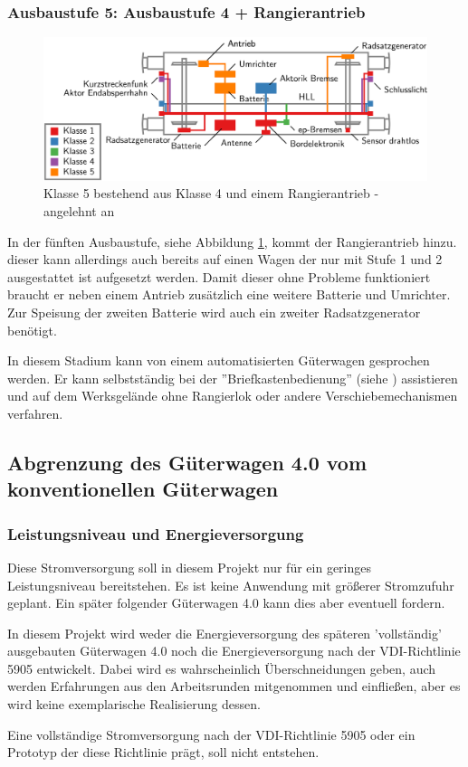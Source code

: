 \subsubsection{Ausbaustufe 5: Ausbaustufe 4 + Rangierantrieb} \label{sec:A5}
\begin{figure}[htbp] 
    \includegraphics[width=\textwidth]{Bilder/Ausbaustufen_5.PNG}
    \caption{Klasse 5 bestehend aus Klasse 4 und einem Rangierantrieb - angelehnt an \cite{ETR_3}}
    \label{fig:Klasse5}
\end{figure} 
In der fünften Ausbaustufe, siehe Abbildung \ref{fig:Klasse5}, kommt der Rangierantrieb hinzu. dieser kann allerdings auch bereits auf einen Wagen der nur mit Stufe 1 und 2 ausgestattet ist aufgesetzt werden. Damit dieser ohne Probleme funktioniert braucht er neben einem Antrieb zusätzlich eine weitere Batterie und Umrichter. Zur Speisung der zweiten Batterie wird auch ein zweiter Radsatzgenerator benötigt.\par
In diesem Stadium kann von einem automatisierten Güterwagen gesprochen werden. Er kann selbstständig bei der ''Briefkastenbedienung'' (siehe \cite{GAK}) assistieren und auf dem Werksgelände ohne Rangierlok oder andere Verschiebemechanismen verfahren.

\subsection{Abgrenzung des Güterwagen 4.0 vom konventionellen Güterwagen}
\subsubsection{Leistungsniveau und Energieversorgung}
Diese Stromversorgung soll in diesem Projekt nur für ein geringes Leistungsniveau bereitstehen. Es ist keine Anwendung mit größerer Stromzufuhr geplant. Ein später folgender Güterwagen 4.0  kann dies aber eventuell fordern.\par
In diesem Projekt wird weder die Energieversorgung des späteren 'vollständig' ausgebauten Güterwagen 4.0 noch die Energieversorgung nach der VDI-Richtlinie 5905 entwickelt. Dabei wird es wahrscheinlich Überschneidungen geben, auch werden Erfahrungen aus den Arbeitsrunden mitgenommen und einfließen, aber es wird keine exemplarische Realisierung dessen.\par
Eine vollständige Stromversorgung nach der VDI-Richtlinie 5905 oder ein Prototyp der diese Richtlinie prägt, soll nicht entstehen. 

